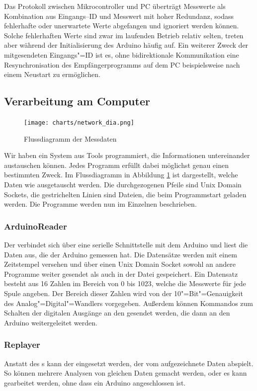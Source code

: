 Das Protokoll zwischen Mikrocontroller und PC überträgt Messwerte als Kombination aus
Eingangs--ID und Messwert mit hoher Redundanz, sodass fehlerhafte oder
unerwartete Werte abgefangen und
ignoriert werden können. Solche fehlerhaften Werte sind zwar im laufenden Betrieb relativ selten,
treten aber während der Initialisierung des Arduino häufig auf. Ein weiterer Zweck der
mitgesendeten Eingangs"=ID ist es, ohne bidirektionale Kommunikation eine Resynchronisation des
Empfängerprogramms auf dem PC beispielsweise nach einem Neustart zu ermöglichen.

\subsection{Verarbeitung am Computer}

\begin{figure}
  \texttt{[image: charts/network\_dia.png]}
  \caption{Flussdiagramm der Messdaten}
  \label{fig:network}
\end{figure}

Wir haben ein System aus Tools programmiert, die Informationen untereinander austauschen können. Jedes Programm erfüllt dabei möglichst genau einen bestimmten Zweck.
Im Flussdiagramm in Abbildung \ref{fig:network} ist dargestellt, welche Daten wie ausgetauscht werden.
Die durchgezogenen Pfeile sind Unix Domain Sockets, die gestrichelten Linien sind Dateien, die beim Programmstart geladen werden.
Die Programme werden nun im Einzelnen beschrieben.

\subsubsection{ArduinoReader}

Der  verbindet sich über eine serielle Schnittstelle mit dem Arduino und liest die Daten aus, die der Arduino gemessen hat.
Die Datensätze werden mit einem Zeitstempel versehen und über einen Unix Domain Socket sowohl an andere Programme weiter gesendet als auch in der Datei  gespeichert.
Ein Datensatz besteht aus 16 Zahlen im Bereich von 0 bis 1023, welche die Messwerte für jede Spule angeben.
Der Bereich dieser Zahlen wird von der 10"=Bit"=Genauigkeit des Analog"=Digital"=Wandlers vorgegeben.
Außerdem können Kommandos zum Schalten der digitalen Ausgänge an den  gesendet werden, die dann an den Arduino weitergeleitet werden.

\subsubsection{Replayer}
Anstatt des s kann der  eingesetzt werden, der vom  aufgezeichnete Daten abspielt.
So können mehrere Analysen von gleichen Daten gemacht werden, oder es kann gearbeitet werden, ohne dass ein Arduino angeschlossen ist.

